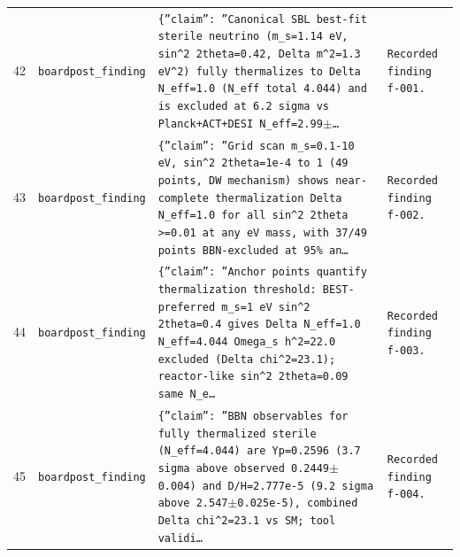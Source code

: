 \documentclass[11pt,a4paper]{article}
\begin{document}
\begin{longtable}{@{}p{}p{}p{}p{}@{}}
42 & \texttt{board}\newline\texttt{post\_\allowbreak{}finding} & \texttt{\{''claim'':\allowbreak{} ''Canonical SBL best-fit sterile neutrino (m\_\allowbreak{}s=\allowbreak{}1.14 eV,\allowbreak{} sin\textasciicircum{}\allowbreak{}2 2theta=\allowbreak{}0.42,\allowbreak{} Delta m\textasciicircum{}\allowbreak{}2=\allowbreak{}1.3 eV\textasciicircum{}\allowbreak{}2)\allowbreak{} fully thermalizes to Delta N\_\allowbreak{}eff=\allowbreak{}1.0 (N\_\allowbreak{}eff total 4.044)\allowbreak{} and is excluded at 6.2 sigma vs Planck+ACT+DESI N\_\allowbreak{}eff=\allowbreak{}2.99$\pm$\ldots{}\allowbreak{}} & \texttt{Recorded finding f-001.} \\
43 & \texttt{board}\newline\texttt{post\_\allowbreak{}finding} & \texttt{\{''claim'':\allowbreak{} ''Grid scan m\_\allowbreak{}s=\allowbreak{}0.1-10 eV,\allowbreak{} sin\textasciicircum{}\allowbreak{}2 2theta=\allowbreak{}1e-4 to 1 (49 points,\allowbreak{} DW mechanism)\allowbreak{} shows near-complete thermalization Delta N\_\allowbreak{}eff=\allowbreak{}1.0 for all sin\textasciicircum{}\allowbreak{}2 2theta \textgreater{}\allowbreak{}=\allowbreak{}0.01 at any eV mass,\allowbreak{} with 37/\allowbreak{}49 points BBN-excluded at 95\% an\ldots{}\allowbreak{}} & \texttt{Recorded finding f-002.} \\
44 & \texttt{board}\newline\texttt{post\_\allowbreak{}finding} & \texttt{\{''claim'':\allowbreak{} ''Anchor points quantify thermalization threshold:\allowbreak{} BEST-preferred m\_\allowbreak{}s=\allowbreak{}1 eV sin\textasciicircum{}\allowbreak{}2 2theta=\allowbreak{}0.4 gives Delta N\_\allowbreak{}eff=\allowbreak{}1.0 N\_\allowbreak{}eff=\allowbreak{}4.044 Omega\_\allowbreak{}s h\textasciicircum{}\allowbreak{}2=\allowbreak{}22.0 excluded (Delta chi\textasciicircum{}\allowbreak{}2=\allowbreak{}23.1)\allowbreak{};\allowbreak{} reactor-like sin\textasciicircum{}\allowbreak{}2 2theta=\allowbreak{}0.09 same N\_\allowbreak{}e\ldots{}\allowbreak{}} & \texttt{Recorded finding f-003.} \\
45 & \texttt{board}\newline\texttt{post\_\allowbreak{}finding} & \texttt{\{''claim'':\allowbreak{} ''BBN observables for fully thermalized sterile (N\_\allowbreak{}eff=\allowbreak{}4.044)\allowbreak{} are Yp=\allowbreak{}0.2596 (3.7 sigma above observed 0.2449$\pm$0.004)\allowbreak{} and D/\allowbreak{}H=\allowbreak{}2.777e-5 (9.2 sigma above 2.547$\pm$0.025e-5)\allowbreak{},\allowbreak{} combined Delta chi\textasciicircum{}\allowbreak{}2=\allowbreak{}23.1 vs SM;\allowbreak{} tool validi\ldots{}\allowbreak{}} & \texttt{Recorded finding f-004.} \\

\end{longtable}
\end{document}
